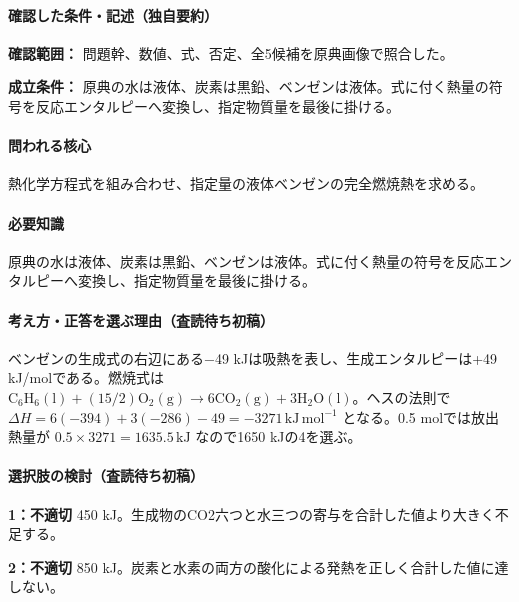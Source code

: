 \paragraph{確認した条件・記述（独自要約）}\mbox{}\par

\noindent\textbf{確認範囲：} 問題幹、数値、式、否定、全5候補を原典画像で照合した。\par

\noindent\textbf{成立条件：} 原典の水は液体、炭素は黒鉛、ベンゼンは液体。式に付く熱量の符号を反応エンタルピーへ変換し、指定物質量を最後に掛ける。\par

\paragraph{問われる核心} 熱化学方程式を組み合わせ、指定量の液体ベンゼンの完全燃焼熱を求める。

\paragraph{必要知識} 原典の水は液体、炭素は黒鉛、ベンゼンは液体。式に付く熱量の符号を反応エンタルピーへ変換し、指定物質量を最後に掛ける。

\paragraph{考え方・正答を選ぶ理由（査読待ち初稿）} ベンゼンの生成式の右辺にある−49 kJは吸熱を表し、生成エンタルピーは+49 kJ/molである。燃焼式は \(\mathrm{C_6H_6(l)}+(15/2)\mathrm{O_2(g)}\to6\mathrm{CO_2(g)}+3\mathrm{H_2O(l)}\)。ヘスの法則で \(\Delta H=6(-394)+3(-286)-49=-3271\,\mathrm{kJ\,mol^{-1}}\) となる。0.5 molでは放出熱量が \(0.5\times3271=1635.5\,\mathrm{kJ}\) なので1650 kJの4を選ぶ。

\paragraph{選択肢の検討（査読待ち初稿）}\mbox{}\par

\noindent\textbf{1：不適切} 450 kJ。生成物のCO2六つと水三つの寄与を合計した値より大きく不足する。\par

\noindent\textbf{2：不適切} 850 kJ。炭素と水素の両方の酸化による発熱を正しく合計した値に達しない。\par

